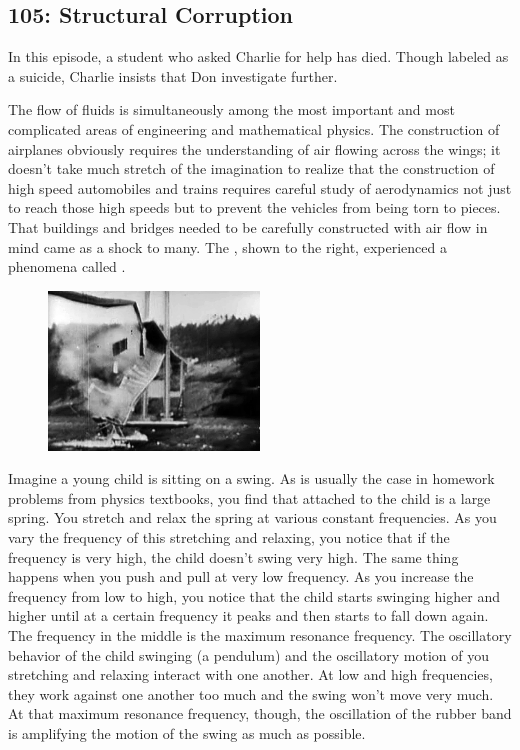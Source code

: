\newpage
\subsection{105: Structural Corruption\label{105}}

In this episode, a student who asked Charlie for help has died.  Though labeled as a suicide, Charlie insists that Don investigate further. \\


The flow of fluids is simultaneously among the most important and most complicated areas of engineering and mathematical physics. The construction of airplanes obviously requires the understanding of air flowing across the wings; it doesn't take much stretch of the imagination to realize that the construction of high speed automobiles and trains requires careful study of aerodynamics not just to reach those high speeds but to prevent the vehicles from being torn to pieces. That buildings and bridges needed to be carefully constructed with air flow in mind came as a shock to many. The , shown to the right, experienced a phenomena called . \\

	\begin{figure}[H]
	   \centering
	   \includegraphics[width=0.5\textwidth]{season1/105/images/105a.png} 
	\end{figure}

Imagine a young child is sitting on a swing. As is usually the case in homework problems from physics textbooks, you find that attached to the child is a large spring. You stretch and relax the spring at various constant frequencies. As you vary the frequency of this stretching and relaxing, you notice that if the frequency is very high, the child doesn't swing very high. The same thing happens when you push and pull at very low frequency. As you increase the frequency from low to high, you notice that the child starts swinging higher and higher until at a certain frequency it peaks and then starts to fall down again.  The frequency in the middle is the maximum resonance frequency. The oscillatory behavior of the child swinging (a pendulum) and the oscillatory motion of you stretching and relaxing interact with one another. At low and high frequencies, they work against one another too much and the swing won't move very much. At that maximum resonance frequency, though, the oscillation of the rubber band is amplifying the motion of the swing as much as possible. \\

